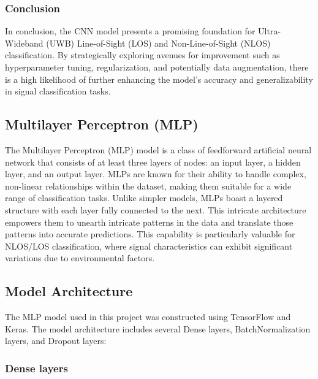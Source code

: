 \subsubsection{Conclusion}

In conclusion, the CNN model presents a promising foundation for Ultra-Wideband (UWB) Line-of-Sight (LOS) and Non-Line-of-Sight (NLOS) classification. By strategically exploring avenues for improvement such as hyperparameter tuning, regularization, and potentially data augmentation, there is a high likelihood of further enhancing the model's accuracy and generalizability in signal classification tasks.





\subsection{Multilayer Perceptron (MLP)}\label{mlp}                                                                                 
The Multilayer Perceptron (MLP) model is a class of feedforward artificial neural network that consists of at least three layers of nodes: an input layer, a hidden layer, and an output layer. MLPs are known for their ability to handle complex, non-linear relationships within the dataset, making them suitable for a wide range of classification tasks. Unlike simpler models, MLPs boast a layered structure with each layer fully connected to the next. This intricate architecture empowers them to unearth intricate patterns in the data and translate those patterns into accurate predictions. This capability is particularly valuable for NLOS/LOS classification, where signal characteristics can exhibit significant variations due to environmental factors.

\subsection{Model Architecture}

The MLP model used in this project was constructed using TensorFlow and Keras. The model architecture includes several Dense layers, BatchNormalization layers, and Dropout layers:

\subsubsection{Dense layers}


